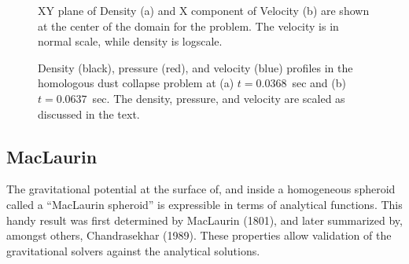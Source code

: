 \begin{figure}[t]
\begin{center}
\caption{\label{Fig:dust_flash3}
  XY plane of Density (a) and X component of Velocity (b) are shown at the center of the domain
for the  problem. The velocity is in normal scale, while density is logscale.
}
\end{center}
\end{figure}

\begin{figure}[t]
\begin{center}
\caption{\label{Fig:dust collapse}
  Density (black), pressure (red), and velocity (blue) profiles
  in the homologous dust collapse problem at (a) $t=0.0368$~sec
  and (b) $t=0.0637$~sec. The density, pressure, and velocity are
  scaled as discussed in the text.
}
\end{center}
\end{figure}
\clearpage



\subsection{MacLaurin}
\label{Sec:SimulationMacLaurin}
The gravitational potential at the surface of, and inside a homogeneous spheroid
called a ``MacLaurin spheroid'' is expressible in terms of analytical functions.
This handy result was first determined by MacLaurin (1801), and later summarized by,
amongst others, Chandrasekhar (1989).  These properties allow validation of 
the \flashx gravitational solvers against the analytical solutions.

